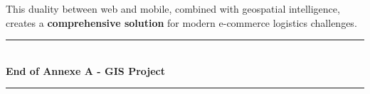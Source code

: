 \documentclass[12pt,a4paper]{article}
\begin{document}
This duality between web and mobile, combined with geospatial intelligence, creates a \textbf{comprehensive solution} for modern e-commerce logistics challenges.

\vspace{2cm}

\begin{center}
\rule{0.8\textwidth}{0.4pt}\\
\vspace{0.5cm}
\textbf{End of Annexe A - GIS Project}\\
\rule{0.8\textwidth}{0.4pt}
\end{center}
\end{document}
